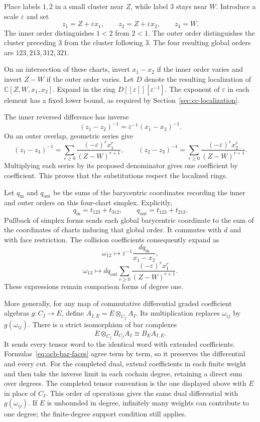 Place labels $1,2$ in a small cluster near $Z$, while label $3$
stays near $W$. Introduce a scale $\varepsilon$ and set
\[
 z_1=Z+\varepsilon x_1,\qquad
 z_2=Z+\varepsilon x_2,\qquad z_3=W.
\]
The inner order distinguishes $1<2$ from $2<1$.
The outer order distinguishes the cluster preceding $3$ from
the cluster following $3$.
The four resulting global orders are $123,213,312,321$.

On an intersection of these charts, invert $x_1-x_2$ if the inner
order varies and invert $Z-W$ if the outer order varies.
Let $D$ denote the resulting localization of
$\mathbb C[Z,W,x_1,x_2]$.
Expand in the ring
$D[[\varepsilon]][\varepsilon^{-1}]$.
The exponent of $\varepsilon$ in each element has a fixed lower
bound, as required by Section~\ref{sec:cc-localization}.

The inner reversed difference has inverse
\[
 (z_1-z_2)^{-1}
 =\varepsilon^{-1}(x_1-x_2)^{-1}.
\]
On an outer overlap, geometric series give
\[
 (z_1-z_3)^{-1}
 =\sum_{r\ge0}\frac{(-\varepsilon)^r x_1^r}{(Z-W)^{r+1}},
 \qquad
 (z_2-z_3)^{-1}
 =\sum_{r\ge0}\frac{(-\varepsilon)^r x_2^r}{(Z-W)^{r+1}}.
\]
Multiplying each series by its proposed denominator gives one
coefficient by coefficient. This proves that the substitutions
respect the localized rings.

Let $q_{\mathrm{in}}$ and $q_{\mathrm{out}}$ be the sums of the
barycentric coordinates recording the inner and outer orders on
this four-chart simplex. Explicitly,
\[
 q_{\mathrm{in}}=t_{123}+t_{312},\qquad
 q_{\mathrm{out}}=t_{123}+t_{213}.
\]
Pullback of simplex forms sends each
global barycentric coordinate to the sum of the coordinates of
charts inducing that global order.
It commutes with $d$ and with face restriction.
The collision coefficients consequently expand as
\[
 \omega_{12}\longmapsto
 \varepsilon^{-1}\frac{dq_{\mathrm{in}}}{x_1-x_2},
\]
\[
 \omega_{13}\longmapsto
 dq_{\mathrm{out}}\sum_{r\ge0}
 \frac{(-\varepsilon)^r x_1^r}{(Z-W)^{r+1}}.
\]
These expressions remain comparison forms of degree one.

More generally, for any map of commutative differential graded
coefficient algebras $g:C_I\to E$, define
$A_{I,E}=E\otimes_{C_I}A_I$.
Its multiplication replaces $\omega_{ij}$ by $g(\omega_{ij})$.
There is a strict isomorphism of bar complexes
\[
 E\otimes_{C_I}B_{C_I}A_I
 \cong B_E A_{I,E}.
\]
It sends every tensor word to the identical word with extended
coefficients. Formulas~\eqref{eq:ocb-bar-faces} agree term by term,
so it preserves the differential and every cut.
For the completed dual, extend coefficients in each finite weight
and then take the inverse limit in each cochain degree, retaining
a direct sum over degrees. The completed tensor convention is the
one displayed above with $E$ in place of $C_I$.
This order of operations gives the same dual differential with
$g(\omega_{ij})$. If $E$ is unbounded in degree, infinitely many
weights can contribute to one degree; the finite-degree support
condition still applies.

